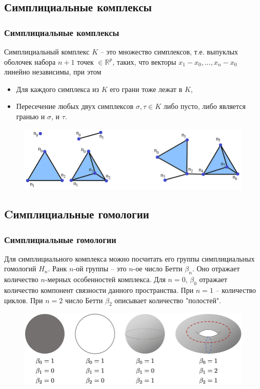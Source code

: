 \documentclass{beamer}
\begin{document}
		\subsection{Симплициальные комплексы}
		\begin{frame}
			\frametitle{Симплициальные комплексы}
			
			\begin{definition}
				Симплициальный комплекс $K$ -- это множество симплексов, т.е. выпуклых оболочек набора $n+1$ точек $\in \mathbb{R}^p$, таких, что векторы $ x_1 - x_0, ..., x_n - x_0 $ линейно независимы, при этом
				\begin{itemize}
					\setlength{\itemsep}{-1mm}
					\item Для каждого симплекса из $K$ его грани тоже лежат в $K$,
					\item Пересечение любых двух симплексов $\sigma, \tau \in K$ либо пусто, либо является гранью и $\sigma$, и $\tau$.
				\end{itemize}
			\end{definition}
			\begin{figure}
				\centering
				\includegraphics[width=\linewidth]{simplexAndComplex.png}
			\end{figure}
		\end{frame}
		\subsection{Cимплициальные гомологии}
		\begin{frame}[fragile]
			\frametitle{Симплициальные гомологии}
			Для симплициального комплекса можно посчитать его группы симплициальных гомологий $H_n$. Ранк $n$-ой группы -- это $n$-ое число Бетти $\beta_n$. Оно отражает количество $n$-мерных особенностей комплекса. Для $n=0$, $\beta_0$ отражает количество компонент связности данного пространства. При $n=1$ -- количество циклов. При $n=2$ число Бетти $\beta_2$ описывает количество "полостей".
			
			\begin{figure}[!htbp]
				\centering
				\includegraphics[width=0.5\linewidth, keepaspectratio=true]{betti_numbers.png}
			\end{figure}
		\end{frame}
		
\end{document}
